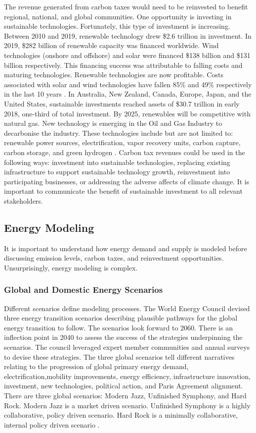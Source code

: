 \documentclass[12pt]{article}
\begin{document}
The revenue generated from carbon taxes would need to be reinvested to benefit regional, national, and global communities. 
One opportunity is investing in sustainable technologies. 
Fortunately, this type of investment is increasing. 
Between 2010 and 2019, renewable technology drew \$2.6 trillion in investment. 
In 2019, \$282 billion of renewable capacity was financed worldwide. 
Wind technologies (onshore and offshore) and solar were financed \$138 billion and \$131 billion respectively. 
This financing success was attributable to falling costs and maturing technologies. 
Renewable technologies are now profitable. 
Costs associated with solar and wind technologies have fallen 85\% and 49\% respectively in the last 10 years \cite{W:10}.
In Australia, New Zealand, Canada, Europe, Japan, and the United States, sustainable investments reached assets of \$30.7 trillion in early 2018, one-third of total investment.
By 2025, renewables will be competitive with natural gas. New technology is emerging in the Oil and Gas Industry to decarbonise the industry. 
These technologies include but are not limited to: renewable power sources, electrification, vapor recovery units, carbon capture, carbon storage, and green hydrogen \cite{A:2}. 
Carbon tax revenues could be used in the following ways: investment into sustainable technologies, replacing existing infrastructure to support sustainable technology growth, reinvestment into participating businesses, or addressing the adverse affects of climate change.
It is important to communicate the benefit of sustainable investment to all relevant stakeholders.

\subsection{Energy Modeling}
It is important to understand how energy demand and supply is modeled before discussing emission levels, carbon taxes, and reinvestment opportunities.
Unsurprisingly, energy modeling is complex.

\subsubsection{Global and Domestic Energy Scenarios}
Different scenarios define modeling processes. 
The World Energy Council devised three energy transition scenarios describing plausible pathways for the global energy transition to follow. 
The scenarios look forward to 2060. There is an inflection point in 2040 to assess the success of the strategies underpinning the scenarios.
The council leveraged expert member communities and annual surveys to devise these strategies.
The three global scenarios tell different narratives relating to the progression of global primary energy demand, electrification,mobility improvements, energy efficiency, infrastructure innovation, investment, new technologies, political action, and Paris Agreement alignment.
There are three global scenarios: Modern Jazz, Unfinished Symphony, and Hard Rock. 
Modern Jazz is a market driven scenario. 
Unfinished Symphony is a highly collaborative, policy driven scenario. 
Hard Rock is a minimally collaborative, internal policy driven scenario \cite{TR:8}.
\end{document}
